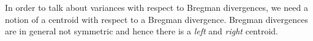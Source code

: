 \documentclass[
    a4paper, %
	fontsize=10pt, %
	twoside=false, %
]{kaobook}
\begin{document}
%
%
%
In order to talk about variances with respect to Bregman divergences, we need a notion of a centroid with respect to a Bregman divergence. Bregman divergences are in general not symmetric and hence there is a \textit{left} and \textit{right} centroid.
\end{document}
